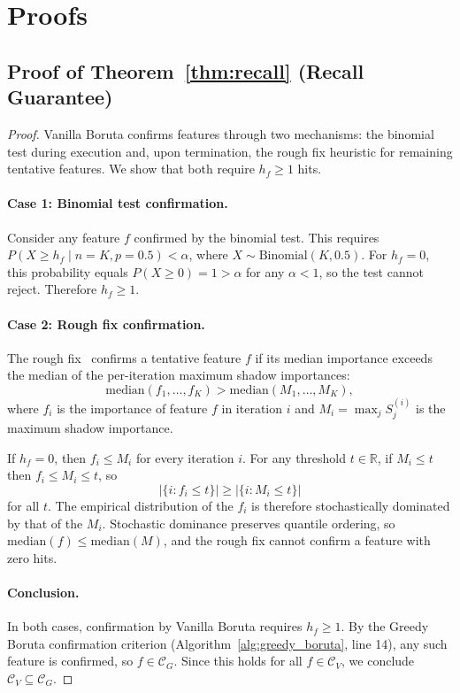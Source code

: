 \documentclass[runningheads]{llncs}
\begin{document}
\appendix

\section{Proofs}
\label{app:proofs}

\subsection{Proof of Theorem~\ref{thm:recall} (Recall Guarantee)}

\begin{proof}
Vanilla Boruta confirms features through two mechanisms: the binomial test during execution and, upon termination, the rough fix heuristic for remaining tentative features. We show that both require $h_f \geq 1$ hits.

\paragraph{Case 1: Binomial test confirmation.}
Consider any feature $f$ confirmed by the binomial test. This requires $P(X \geq h_f \mid n = K, p = 0.5) < \alpha$, where $X \sim \text{Binomial}(K, 0.5)$. For $h_f = 0$, this probability equals $P(X \geq 0) = 1 > \alpha$ for any $\alpha < 1$, so the test cannot reject. Therefore $h_f \geq 1$.

\paragraph{Case 2: Rough fix confirmation.}
The rough fix~\cite{kursa2010feature} confirms a tentative feature $f$ if its median importance exceeds the median of the per-iteration maximum shadow importances:
$$\mathrm{median}(f_1, \ldots, f_K) > \mathrm{median}(M_1, \ldots, M_K),$$
where $f_i$ is the importance of feature $f$ in iteration $i$ and $M_i = \max_j S_j^{(i)}$ is the maximum shadow importance.

If $h_f = 0$, then $f_i \leq M_i$ for every iteration $i$. For any threshold $t \in \mathbb{R}$, if $M_i \leq t$ then $f_i \leq M_i \leq t$, so
$$|\{i : f_i \leq t\}| \geq |\{i : M_i \leq t\}|$$
for all $t$. The empirical distribution of the $f_i$ is therefore stochastically dominated by that of the $M_i$. Stochastic dominance preserves quantile ordering, so $\mathrm{median}(f) \leq \mathrm{median}(M)$, and the rough fix cannot confirm a feature with zero hits.

\paragraph{Conclusion.}
In both cases, confirmation by Vanilla Boruta requires $h_f \geq 1$. By the Greedy Boruta confirmation criterion (Algorithm~\ref{alg:greedy_boruta}, line 14), any such feature is confirmed, so $f \in \mathcal{C}_G$. Since this holds for all $f \in \mathcal{C}_V$, we conclude $\mathcal{C}_V \subseteq \mathcal{C}_G$.
\end{proof}
\end{document}
